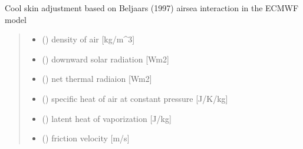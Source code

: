 \documentclass[letterpaper,10pt,english]{sphinxmanual}
\begin{document}
\begin{fulllineitems}
\label{\detokenize{users_guide:AirSeaFluxCode.cs_wl_subs.cs_Beljaars}}
\pysigstartsignatures
\pysiglinewithargsret
{}
{\sphinxparamcomma {}\sphinxparamcomma {}\sphinxparamcomma {}\sphinxparamcomma {}\sphinxparamcomma {}\sphinxparamcomma {}\sphinxparamcomma {}\sphinxparamcomma {}\sphinxparamcomma {}}
{}
\pysigstopsignatures
\sphinxAtStartPar
Cool skin adjustment based on Beljaars (1997)
air\sphinxhyphen{}sea interaction in the ECMWF model
\begin{quote}\begin{description}
\begin{itemize}
\item {}
\sphinxAtStartPar
{} () \textendash{} density of air           {[}kg/m\textasciicircum{}3{]}

\item {}
\sphinxAtStartPar
{} () \textendash{} downward solar radiation {[}Wm\sphinxhyphen{}2{]}

\item {}
\sphinxAtStartPar
{} () \textendash{} net thermal radiaion     {[}Wm\sphinxhyphen{}2{]}

\item {}
\sphinxAtStartPar
{} () \textendash{} specific heat of air at constant pressure {[}J/K/kg{]}

\item {}
\sphinxAtStartPar
{} () \textendash{} latent heat of vaporization   {[}J/kg{]}

\item {}
\sphinxAtStartPar
{} () \textendash{} friction velocity         {[}m/s{]}


\end{itemize}
\end{description}
\end{quote}
\end{fulllineitems}
\end{document}
